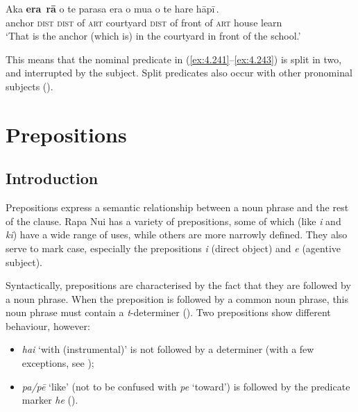 \ea\label{ex:4.243}
\gll {\ob}{\ꞌ}Aka \textbf{era}\,{\cb} \textbf{rā} {\ob}o te parasa era o mu{\ꞌ}a o te hare hāpī\,{\cb}. \\
{\db}anchor \textsc{dist} \textsc{dist} {\db}of \textsc{art} courtyard \textsc{dist} of front of \textsc{art} house learn \\

\glt
‘That is the anchor (which is) in the courtyard in front of the school.’ \textstyleExampleref{[R413.675]} 
\z

This means that the nominal predicate in (\ref{ex:4.241}–\ref{ex:4.243}) is split in two, and interrupted by the subject. Split predicates also occur with other pronominal subjects ().
\section{Prepositions}\label{sec:4.7}
\subsection{Introduction}\label{sec:4.7.1}

Prepositions express a semantic relationship between a noun phrase and the rest of the clause. Rapa Nui has a variety of prepositions, some of which (like \textit{{\ꞌ}i} and \textit{ki}) have a wide range of uses, while others are more narrowly defined. They also serve to mark case, especially the prepositions \textit{i} (direct object) and \textit{e} (agentive subject).

Syntactically, prepositions are characterised by the fact that they are followed by a noun phrase. When the preposition is followed by a common noun phrase, this noun phrase must contain a \textit{t}{}-determiner (). Two prepositions show different behaviour, however:

\begin{itemize}
\item 
\textit{hai} ‘with (instrumental)’ is not followed by a determiner (with a few exceptions, see );

\item 
\textit{pa/pē} ‘like’ (not to be confused with \textit{pe} ‘toward’) is followed by the predicate marker \textit{he} ().

\end{itemize}

